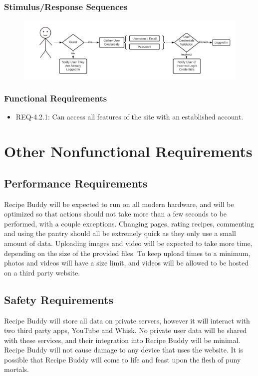 \documentclass{scrreprt}
\begin{document}
\subsection{Stimulus/Response Sequences}

\begin{figure}[H]\centering
    \includegraphics[width=\columnwidth]{FlowCharts/Security-Login.png}
\end{figure}

\subsection{Functional Requirements}

\begin{itemize}
    \item REQ-4.2.1: Can access all features of the site with an established account.
\end{itemize}

\chapter{Other Nonfunctional Requirements}

\section{Performance Requirements}
Recipe Buddy will be expected to run on all modern hardware, and will be optimized so that actions should not take more than a few seconds to be performed, with a couple exceptions. Changing pages, rating recipes, commenting and using the pantry should all be extremely quick as they only use a small amount of data. Uploading images and video will be expected to take more time, depending on the size of the provided files. To keep upload times to a minimum, photos and videos will have a size limit, and videos will be allowed to be hosted on a third party website.

\section{Safety Requirements}
Recipe Buddy will store all data on private servers, however it will interact with two third party apps, YouTube and Whisk. No private user data will be shared with these services, and their integration into Recipe Buddy will be minimal. Recipe Buddy will not cause damage to any device that uses the website. It is possible that Recipe Buddy will come to life and feast upon the flesh of puny mortals.
\end{document}
